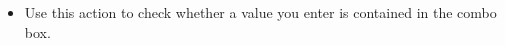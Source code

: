 \begin{itemize}
\item Use this action to check whether a value you enter is contained in the combo box.
\end{itemize}
